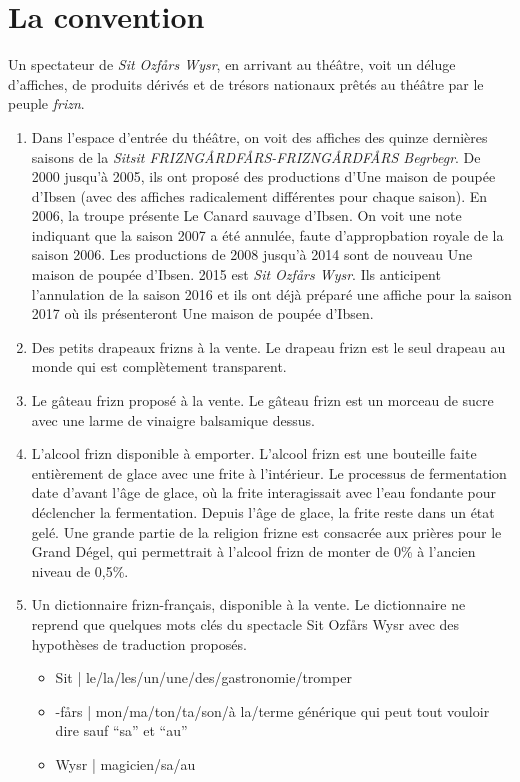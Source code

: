 \section*{La convention}
Un spectateur de \emph{Sit Ozfårs Wysr}, en arrivant au théâtre, voit un
déluge d'affiches, de produits dérivés et de trésors nationaux prêtés au
théâtre par le peuple \emph{frizn}.
\begin{enumerate}
\item Dans l'espace d'entrée du théâtre, on voit des affiches des quinze
dernières saisons de la \emph{Sitsit FRIZNGÅRDFÅRS-FRIZNGÅRDFÅRS Begrbegr}.
De 2000 jusqu'à 2005, ils ont proposé des productions d'Une maison de poupée
d'Ibsen (avec des affiches radicalement différentes pour chaque saison). En 2006,
la troupe présente Le Canard sauvage d'Ibsen. On voit une note indiquant
que la saison 2007 a été annulée,
faute d'appropbation royale de la saison 2006. Les productions de 2008 jusqu'à 2014 sont de nouveau Une maison
de poupée d'Ibsen. 2015 est \emph{Sit Ozfårs Wysr}. Ils anticipent
l'annulation de la saison 2016 et ils ont déjà préparé une affiche pour la
saison 2017 où ils présenteront Une maison de poupée d'Ibsen.
\item Des petits drapeaux frizns à la vente. Le drapeau frizn est le seul
drapeau au monde qui est complètement transparent.
\item Le gâteau frizn proposé à la vente. Le gâteau frizn est un morceau
de sucre avec une larme de vinaigre balsamique dessus.
\item L’alcool frizn disponible à emporter. L'alcool frizn est une bouteille
faite entièrement de glace avec une frite à l'intérieur. Le processus de
fermentation date
d'avant l'âge de glace, où la frite interagissait avec l'eau fondante pour
déclencher la fermentation. Depuis l'âge de glace, la frite reste dans un
état gelé. Une grande partie de la religion frizne est consacrée aux prières
pour le Grand
Dégel, qui permettrait à l'alcool frizn de monter de 0\% à l'ancien
niveau de 0,5\%.
\item Un dictionnaire frizn-français, disponible à la vente. Le dictionnaire
ne reprend que quelques mots clés du spectacle Sit Ozfårs Wysr avec des
hypothèses de traduction proposés.
  \begin{itemize}
  \item Sit | le/la/les/un/une/des/gastronomie/tromper
  \item -fårs | mon/ma/ton/ta/son/à la/terme générique qui peut tout vouloir
  dire sauf ``sa'' et ``au''
  \item Wysr | magicien/sa/au

\end{itemize}
\end{enumerate}
